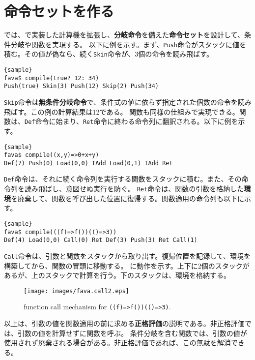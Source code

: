 \documentclass[10pt,a4paper]{book}
\begin{document}
\chapter{命令セットを作る\label{chap:VM}}

では、で実装した計算機を拡張し、\textbf{分岐命令}を備えた\textbf{命令セット}を設計して、条件分岐や関数を実現する。
以下に例を示す。まず、\texttt{Push}命令がスタックに値を積む。その値が偽なら、続く\texttt{Skin}命令が、3個の命令を読み飛ばす。

\begin{Verbatim}{sample}
fava$ compile(true? 12: 34)
Push(true) Skin(3) Push(12) Skip(2) Push(34)
\end{Verbatim}

\texttt{Skip}命令は\textbf{無条件分岐命令}で、条件式の値に依らず指定された個数の命令を読み飛ばす。この例の計算結果は12である。
関数も同様の仕組みで実現できる。関数は、\texttt{Def}命令に始まり、\texttt{Ret}命令に終わる命令列に翻訳される。以下に例を示す。

\begin{Verbatim}{sample}
fava$ compile((x,y)=>0+x+y)
Def(7) Push(0) Load(0,0) IAdd Load(0,1) IAdd Ret
\end{Verbatim}

\texttt{Def}命令は、それに続く命令列を実行する関数をスタックに積む。また、その命令列を読み飛ばし、意図せぬ実行を防ぐ。
\texttt{Ret}命令は、関数の引数を格納した\textbf{環境}を廃棄して、関数を呼び出した位置に復帰する。関数適用の命令列も以下に示す。

\begin{Verbatim}{sample}
fava$ compile(((f)=>f())(()=>3))
Def(4) Load(0,0) Call(0) Ret Def(3) Push(3) Ret Call(1)
\end{Verbatim}

\texttt{Call}命令は、引数と関数をスタックから取り出す。復帰位置を記録して、環境を構築してから、関数の冒頭に移動する。
に動作を示す。上下に2個のスタックがあるが、上のスタックで計算を行う。下のスタックは、環境を格納する。

\begin{figure}[h]
\centering
\texttt{[image: images/fava.call2.eps]}
\caption{function call mechanism for \texttt{((f)=>f())(()=>3)}.\label{fig:call}}
\end{figure}

以上は、引数の値を関数適用の前に求める\textbf{正格評価}の説明である。非正格評価では、引数の値を計算せずに関数を呼ぶ。
条件分岐を含む関数では、引数の値が使用されず廃棄される場合がある。非正格評価であれば、この無駄を解消できる。
\end{document}
